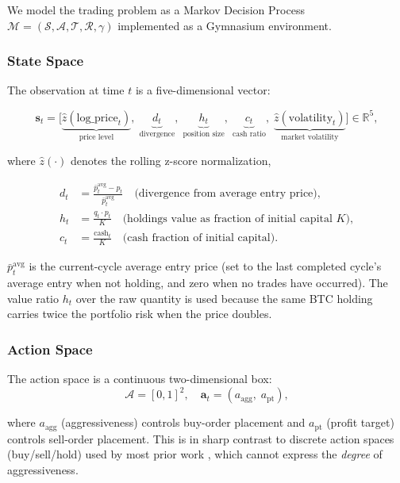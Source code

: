 \documentclass[11pt, a4paper]{article}
\begin{document}
We model the trading problem as a Markov Decision Process
$\mathcal{M} = (\mathcal{S}, \mathcal{A}, \mathcal{T}, \mathcal{R}, \gamma)$
implemented as a Gymnasium environment.

\subsubsection*{State Space}

The observation at time $t$ is a five-dimensional vector:

\begin{equation}
    \bm{s}_t = \bigl[
        \underbrace{\hat{z}(\text{log\_price}_t)}_{\text{price level}},\;
        \underbrace{d_t}_{\text{divergence}},\;
        \underbrace{h_t}_{\text{position size}},\;
        \underbrace{c_t}_{\text{cash ratio}},\;
        \underbrace{\hat{z}(\text{volatility}_t)}_{\text{market volatility}}
    \bigr] \in \mathbb{R}^5,
\end{equation}

where $\hat{z}(\cdot)$ denotes the rolling z-score normalization,

\begin{align}
    d_t &= \frac{\bar{p}^\text{avg}_t - p_t}{\bar{p}^\text{avg}_t}
           \quad \text{(divergence from average entry price)}, \\
    h_t &= \frac{q_t \cdot p_t}{K}
           \quad \text{(holdings value as fraction of initial capital $K$)}, \\
    c_t &= \frac{\text{cash}_t}{K}
           \quad \text{(cash fraction of initial capital)}.
\end{align}

$\bar{p}^\text{avg}_t$ is the current-cycle average entry price (set to the last
completed cycle's average entry when not holding, and zero when no trades have
occurred).
The value ratio $h_t$ over the raw quantity is used because the same BTC holding
carries twice the portfolio risk when the price doubles.

\subsubsection*{Action Space}

The action space is a continuous two-dimensional box:
\begin{equation}
    \mathcal{A} = [0, 1]^2,
    \quad
    \bm{a}_t = (a_\text{agg},\; a_\text{pt}),
\end{equation}

where $a_\text{agg}$ (aggressiveness) controls buy-order placement and $a_\text{pt}$
(profit target) controls sell-order placement.
This is in sharp contrast to discrete action spaces (buy/sell/hold) used by most
prior work \citep{liu2021bitcoin, yasin2024rl}, which cannot express the
\emph{degree} of aggressiveness.
\end{document}
